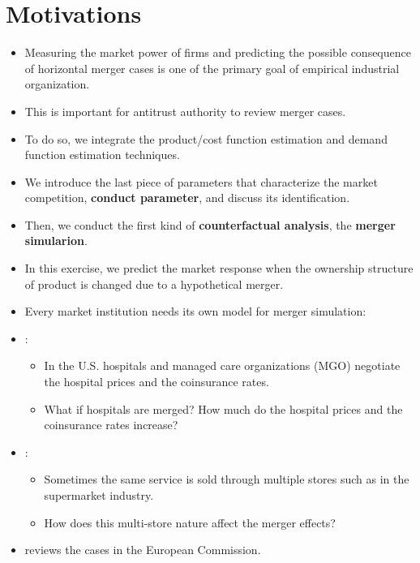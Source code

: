 \documentclass[
]{book}
\providecommand{\tightlist}{%
  \setlength{\itemsep}{0pt}\setlength{\parskip}{0pt}}
\begin{document}
\hypertarget{motivations-2}{%
\section{Motivations}\label{motivations-2}}

\begin{itemize}
\tightlist
\item
  Measuring the market power of firms and predicting the possible consequence of horizontal merger cases is one of the primary goal of empirical industrial organization.
\item
  This is important for antitrust authority to review merger cases.
\item
  To do so, we integrate the product/cost function estimation and demand function estimation techniques.
\item
  We introduce the last piece of parameters that characterize the market competition, \textbf{conduct parameter}, and discuss its identification.
\item
  Then, we conduct the first kind of \textbf{counterfactual analysis}, the \textbf{merger simularion}.
\item
  In this exercise, we predict the market response when the ownership structure of product is changed due to a hypothetical merger.
\item
  Every market institution needs its own model for merger simulation:
\item
  \citet{Gowrisankaran2015}:

  \begin{itemize}
  \tightlist
  \item
    In the U.S. hospitals and managed care organizations (MGO) negotiate the hospital prices and the coinsurance rates.
  \item
    What if hospitals are merged? How much do the hospital prices and the coinsurance rates increase?
  \end{itemize}
\item
  \citet{Smith2004}:

  \begin{itemize}
  \tightlist
  \item
    Sometimes the same service is sold through multiple stores such as in the supermarket industry.
  \item
    How does this multi-store nature affect the merger effects?
  \end{itemize}
\item
  \citet{Ivaldi2005} reviews the cases in the European Commission.
\end{itemize}
\end{document}

